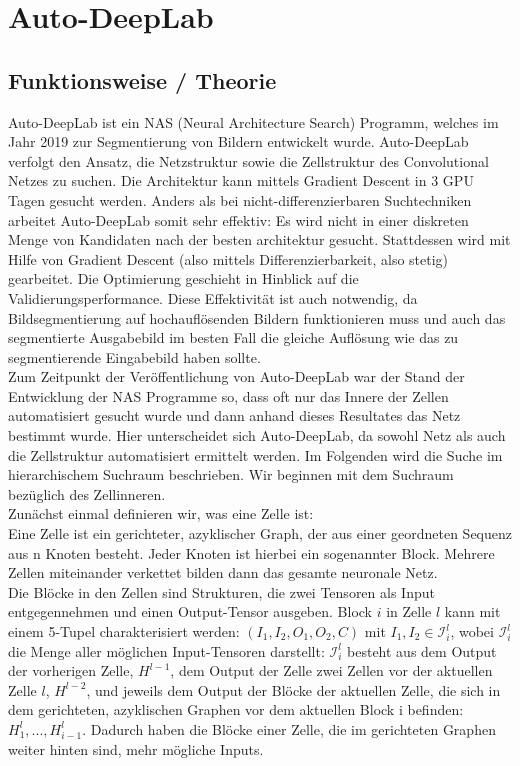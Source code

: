 \chapter{Auto-DeepLab}
\label{ch:autodeeplab}


\section{Funktionsweise / Theorie}

Auto-DeepLab ist ein NAS (Neural Architecture Search) Programm, welches im Jahr 2019 zur Segmentierung von Bildern entwickelt wurde. Auto-DeepLab verfolgt den Ansatz, die Netzstruktur sowie die Zellstruktur des Convolutional Netzes zu suchen. Die Architektur kann mittels Gradient Descent in 3 GPU Tagen gesucht werden. Anders als bei nicht-differenzierbaren Suchtechniken arbeitet Auto-DeepLab somit sehr effektiv: Es wird nicht in einer diskreten Menge von Kandidaten nach der besten architektur gesucht. Stattdessen wird mit Hilfe von Gradient Descent (also mittels Differenzierbarkeit, also stetig) gearbeitet. Die Optimierung geschieht in Hinblick auf die Validierungsperformance. Diese Effektivität ist auch notwendig, da Bildsegmentierung auf hochauflösenden Bildern funktionieren muss und auch das segmentierte Ausgabebild im besten Fall die gleiche Auflösung wie das zu segmentierende Eingabebild haben sollte.\\
Zum Zeitpunkt der Veröffentlichung von Auto-DeepLab war der Stand der Entwicklung der NAS Programme so, dass oft nur das Innere der Zellen automatisiert gesucht wurde und dann anhand dieses Resultates das Netz bestimmt wurde. Hier unterscheidet sich Auto-DeepLab, da sowohl Netz als auch die Zellstruktur automatisiert ermittelt werden.
Im Folgenden wird die Suche im hierarchischem Suchraum beschrieben. Wir beginnen mit dem Suchraum bezüglich des Zellinneren.\\[0.3cm]
Zunächst einmal definieren wir, was eine Zelle ist:\\
Eine Zelle ist ein gerichteter, azyklischer Graph, der aus einer geordneten Sequenz aus n Knoten besteht. Jeder Knoten ist hierbei ein sogenannter Block. Mehrere Zellen miteinander verkettet bilden dann das gesamte neuronale Netz.\\
Die Blöcke in den Zellen sind Strukturen, die zwei Tensoren als Input entgegennehmen und einen Output-Tensor ausgeben. Block $i$ in Zelle $l$ kann mit einem 5-Tupel charakterisiert werden: $(I_1, I_2, O_1, O_2, C)$ mit $I_1, I_2 \in \mathcal{I}_{i}^{l}$, wobei $\mathcal{I}_{i}^{l}$ die Menge aller möglichen Input-Tensoren darstellt: $\mathcal{I}_{i}^{l}$ besteht aus dem Output der vorherigen Zelle, $H^{l-1}$, dem Output der Zelle zwei Zellen vor der aktuellen Zelle $l$, $H^{l-2}$, und jeweils dem Output der Blöcke der aktuellen Zelle, die sich in dem gerichteten, azyklischen Graphen vor dem aktuellen Block i befinden: $H_{1}^{l}, ... , H_{i-1}^{l}$. Dadurch haben die Blöcke einer Zelle, die im gerichteten Graphen weiter hinten sind, mehr mögliche Inputs.\\
